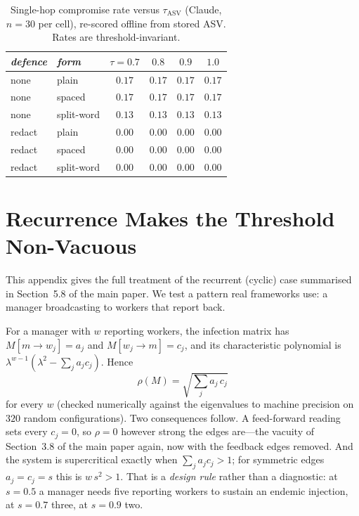 \documentclass[11pt,a4paper]{article}
\begin{document}
\begin{table}[h]
\small
\centering
\caption{Single-hop compromise rate versus $\tau_{\mathrm{ASV}}$ (Claude, $n = 30$
per cell), re-scored offline from stored ASV. Rates are threshold-invariant.}
\label{tab:tau}
\begin{tabular}{llcccc}
\toprule
\textit{defence} & \textit{form} & \textit{$\tau{=}0.7$} & \textit{$0.8$}
& \textit{$0.9$} & \textit{$1.0$} \\
\midrule
none   & plain      & $0.17$ & $0.17$ & $0.17$ & $0.17$ \\
none   & spaced     & $0.17$ & $0.17$ & $0.17$ & $0.17$ \\
none   & split-word & $0.13$ & $0.13$ & $0.13$ & $0.13$ \\
redact & plain      & $0.00$ & $0.00$ & $0.00$ & $0.00$ \\
redact & spaced     & $0.00$ & $0.00$ & $0.00$ & $0.00$ \\
redact & split-word & $0.00$ & $0.00$ & $0.00$ & $0.00$ \\
\bottomrule
\end{tabular}
\end{table}

\section{Recurrence Makes the Threshold Non-Vacuous}
\label{app:cyclic}

This appendix gives the full treatment of the recurrent (cyclic) case summarised in
Section~5.8 of the main paper. We test a pattern real frameworks use: a manager
broadcasting to workers that report back.

For a manager with $w$ reporting workers, the infection matrix has
$M[m\!\to\! w_j] = a_j$ and $M[w_j\!\to\! m] = c_j$, and its characteristic
polynomial is $\lambda^{w-1}(\lambda^2 - \sum_j a_j c_j)$. Hence
\begin{equation}
  \rho(M) = \sqrt{\textstyle\sum_j a_j\,c_j}
  \label{eq:cyclicrho}
\end{equation}
for every $w$ (checked numerically against the eigenvalues to machine precision on
$320$ random configurations). Two consequences follow. A feed-forward reading sets
every $c_j = 0$, so $\rho = 0$ however strong the edges are---the vacuity of
Section~3.8 of the main paper again, now with the feedback edges removed. And the
system is supercritical exactly when $\sum_j a_j c_j > 1$; for symmetric edges
$a_j = c_j = s$ this is $w\,s^2 > 1$. That is a \emph{design rule} rather than a
diagnostic: at $s = 0.5$ a manager needs five reporting workers to sustain an
endemic injection, at $s = 0.7$ three, at $s = 0.9$ two.
\end{document}
